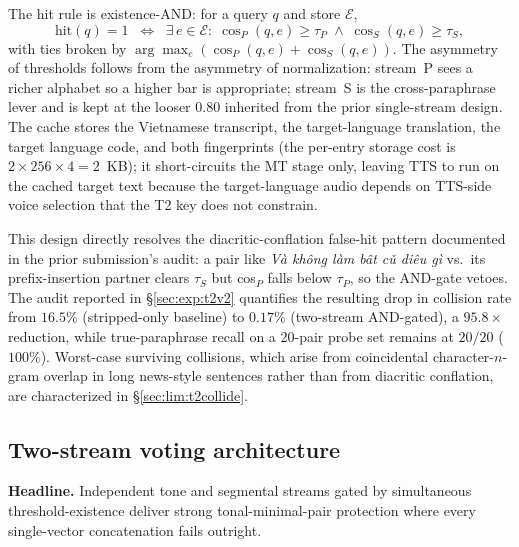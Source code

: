 \documentclass[a4paper,fleqn]{cas-dc}
\begin{document}
The hit rule is existence-AND: for a query $q$ and store $\mathcal{E}$,
\begin{equation}
\mathrm{hit}(q) = 1 \;\;\Longleftrightarrow\;\;
  \exists\, e \in \mathcal{E}:\;\cos_{P}(q,e) \geq \tau_{P} \;\wedge\; \cos_{S}(q,e) \geq \tau_{S},
\label{eq:t2twostream}
\end{equation}
with ties broken by $\arg\max_{e}(\cos_{P}(q,e) + \cos_{S}(q,e))$. The asymmetry of thresholds follows from the asymmetry of normalization: stream~P sees a richer alphabet so a higher bar is appropriate; stream~S is the cross-paraphrase lever and is kept at the looser $0.80$ inherited from the prior single-stream design. The cache stores the Vietnamese transcript, the target-language translation, the target language code, and both fingerprints (the per-entry storage cost is $2 \times 256 \times 4 = 2$~KB); it short-circuits the MT stage only, leaving TTS to run on the cached target text because the target-language audio depends on TTS-side voice selection that the T2 key does not constrain.

This design directly resolves the diacritic-conflation false-hit pattern documented in the prior submission's audit: a pair like \emph{V\`a kh\^ong l\`am b\^at c\v{u} di\^eu g\`i} vs.\ its prefix-insertion partner clears $\tau_{S}$ but cos$_{P}$ falls below $\tau_{P}$, so the AND-gate vetoes. The audit reported in \S\ref{sec:exp:t2v2} quantifies the resulting drop in collision rate from $16.5\%$ (stripped-only baseline) to $0.17\%$ (two-stream AND-gated), a $95.8\times$ reduction, while true-paraphrase recall on a 20-pair probe set remains at $20/20$ ($100\%$). Worst-case surviving collisions, which arise from coincidental character-$n$-gram overlap in long news-style sentences rather than from diacritic conflation, are characterized in \S\ref{sec:lim:t2collide}.

\subsection{Two-stream voting architecture}\label{sec:method:twostream}
\textbf{Headline.} Independent tone and segmental streams gated by simultaneous threshold-existence deliver strong tonal-minimal-pair protection where every single-vector concatenation fails outright.
\end{document}
